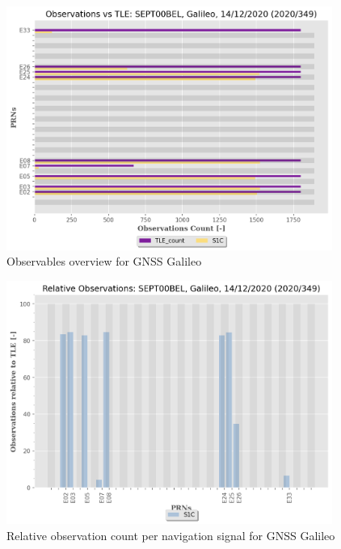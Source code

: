 \begin{figure}[H]%
\centering%
\includegraphics[width=0.95\textwidth]{png/SEPT00BEL_R_20203491400_30M_01S_MO_E-ObsTLE.png}%
\caption{\label{fig:obst_gnss_E} Observables overview for GNSS Galileo}%
\end{figure}

%


\begin{figure}[H]%
\centering%
\includegraphics[width=0.95\textwidth]{png/SEPT00BEL_R_20203491400_30M_01S_MO_E-PERC.png}%
\caption{\label{fig:prec_obst_gnss_E} Relative observation count per navigation signal for GNSS Galileo}%
\end{figure}

%
\clearpage

